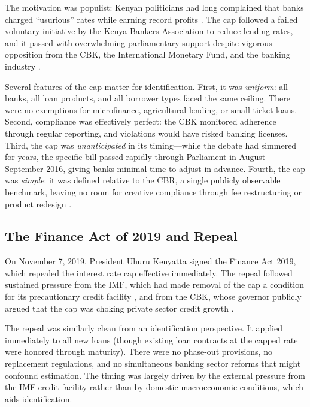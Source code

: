 \documentclass[12pt]{article}
\begin{document}
The motivation was populist: Kenyan politicians had long complained that banks charged ``usurious'' rates while earning record profits \citep{mbugua2018effects}. The cap followed a failed voluntary initiative by the Kenya Bankers Association to reduce lending rates, and it passed with overwhelming parliamentary support despite vigorous opposition from the CBK, the International Monetary Fund, and the banking industry \citep{imf2018kenya}.

Several features of the cap matter for identification. First, it was \textit{uniform}: all banks, all loan products, and all borrower types faced the same ceiling. There were no exemptions for microfinance, agricultural lending, or small-ticket loans. Second, compliance was effectively perfect: the CBK monitored adherence through regular reporting, and violations would have risked banking licenses. Third, the cap was \textit{unanticipated} in its timing---while the debate had simmered for years, the specific bill passed rapidly through Parliament in August--September 2016, giving banks minimal time to adjust in advance. Fourth, the cap was \textit{simple}: it was defined relative to the CBR, a single publicly observable benchmark, leaving no room for creative compliance through fee restructuring or product redesign \citep{igan2023credit}.

\subsection{The Finance Act of 2019 and Repeal}

On November 7, 2019, President Uhuru Kenyatta signed the Finance Act 2019, which repealed the interest rate cap effective immediately. The repeal followed sustained pressure from the IMF, which had made removal of the cap a condition for its precautionary credit facility \citep{imf2018kenya}, and from the CBK, whose governor publicly argued that the cap was choking private sector credit growth \citep{cbk2019}.

The repeal was similarly clean from an identification perspective. It applied immediately to all new loans (though existing loan contracts at the capped rate were honored through maturity). There were no phase-out provisions, no replacement regulations, and no simultaneous banking sector reforms that might confound estimation. The timing was largely driven by the external pressure from the IMF credit facility rather than by domestic macroeconomic conditions, which aids identification.
\end{document}
